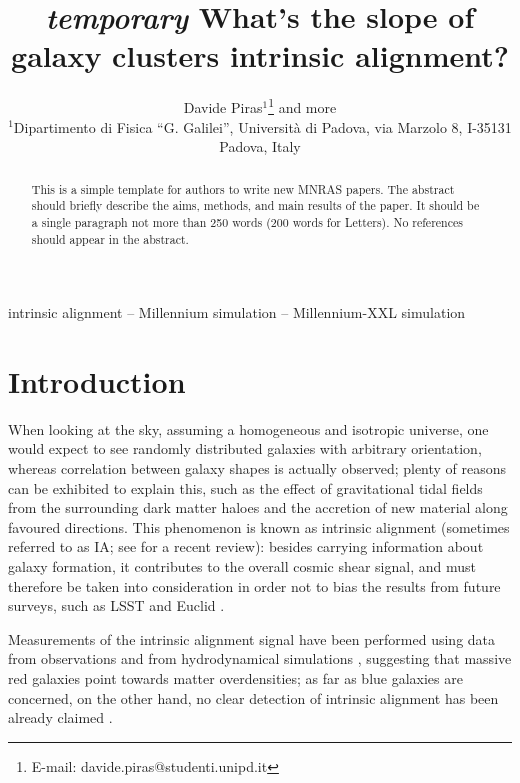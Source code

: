 \documentclass[a4paper,fleqn,usenatbib]{mnras}
\title[\textit{temporary} Slope of intrinsic alignment amplitude vs mass]{\textit{temporary} What's the slope of galaxy clusters intrinsic alignment?}
\author[D. Piras and more]{
Davide Piras$^{1}$\thanks{E-mail: davide.piras@studenti.unipd.it}
and more
\\
$^{1}$Dipartimento di Fisica ``G. Galilei'', Universit\`{a} di Padova, via Marzolo 8, I-35131 Padova, Italy\\
}
\begin{document}
\label{firstpage}
\pagerange{\pageref{firstpage}--\pageref{lastpage}}
\maketitle

\begin{abstract}
This is a simple template for authors to write new MNRAS papers.
The abstract should briefly describe the aims, methods, and main results of the paper.
It should be a single paragraph not more than 250 words (200 words for Letters).
No references should appear in the abstract.
\end{abstract}

\begin{keywords}
intrinsic alignment -- Millennium simulation -- Millennium-XXL simulation
\end{keywords}



\section{Introduction}
\label{sec:intro}
When looking at the sky, assuming a homogeneous and isotropic universe, one would expect to see randomly distributed galaxies with arbitrary orientation, whereas correlation between galaxy shapes is actually observed; plenty of reasons can be exhibited to explain this, such as the effect of gravitational tidal fields from the surrounding dark matter haloes and the accretion of new material along favoured directions. This phenomenon is known as intrinsic alignment (sometimes referred to as IA; see \citet{Joachimietal2015} for a recent review): besides carrying information about galaxy formation, it contributes to the overall cosmic shear signal, and must therefore be taken into consideration in order not to bias the results from future surveys, such as LSST \citep{LSST2009} and Euclid \citep{Euclid2011}.

Measurements of the intrinsic alignment signal have been performed using data from observations \citep{Mandelbaumetal2006, Hirataetal2007, Okumuraetal2009} and from hydrodynamical simulations \citep{Codisetal2015, Velliscigetal2015, Chisarietal2015, Hilbertetal2016, Tennetietal2016}, suggesting that massive red galaxies point towards matter overdensities; as far as blue galaxies are concerned, on the other hand, no clear detection of intrinsic alignment has been already claimed \citep{Hirataetal2007, Mandelbaumetal2011}.
\end{document}
